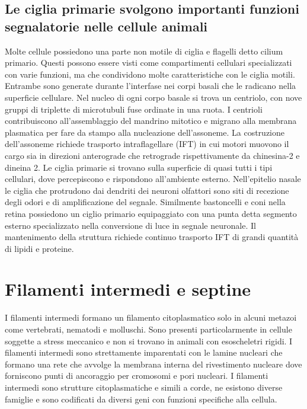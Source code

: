 \subsection{Le ciglia primarie svolgono importanti funzioni segnalatorie nelle cellule animali}
Molte cellule possiedono una parte non motile di ciglia e flagelli detto cilium primario. Questi possono essere visti come compartimenti cellulari specializzati con varie funzioni, ma 
che condividono molte caratteristiche con le ciglia motili. Entrambe sono generate durante l'interfase nei corpi basali che le radicano nella superficie cellulare. Nel nucleo di ogni
corpo basale si trova un centriolo, con nove gruppi di triplette di microtubuli fuse ordinate in una ruota. I centrioli contribuiscono all'assemblaggio del mandrino mitotico e 
migrano alla membrana plasmatica per fare da stampo alla nucleazione dell'assoneme. La costruzione dell'assoneme richiede trasporto intraflagellare (IFT) in cui motori muovono il cargo
sia in direzioni anterograde che retrograde rispettivamente da chinesina-2 e dineina 2. Le ciglia primarie si trovano sulla superficie di quasi tutti i tipi cellulari, dove percepiscono
e rispondono all'ambiente esterno. Nell'epitelio nasale le ciglia che protrudono dai dendriti dei neuroni olfattori sono siti di recezione degli odori e di amplificazione del segnale. 
Similmente bastoncelli e coni nella retina possiedono un ciglio primario equipaggiato con una punta detta segmento esterno specializzato nella conversione di luce in segnale neuronale. 
Il mantenimento della struttura richiede continuo trasporto IFT di grandi quantit\`a di lipidi e proteine. 
\section{Filamenti intermedi e septine}
I filamenti intermedi formano un filamento citoplasmatico solo in alcuni metazoi come vertebrati, nematodi e molluschi. Sono presenti particolarmente in cellule soggette a stress 
meccanico e non si trovano in animali con esoscheletri rigidi. I filamenti intermedi sono strettamente imparentati con le lamine nucleari che formano una rete che avvolge la membrana 
interna del rivestimento nucleare dove forniscono punti di ancoraggio per cromosomi e pori nucleari. I filamenti intermedi sono strutture citoplasmatiche e simili a corde, ne esistono 
diverse famiglie e sono codificati da diversi geni con funzioni specifiche alla cellula. 

